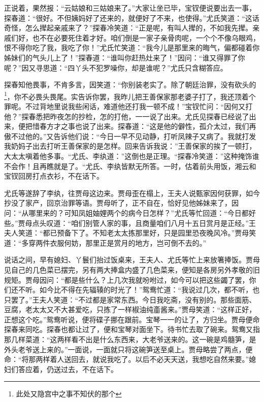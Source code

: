 \documentclass[12pt,oneside]{book}
\begin{document}
正说着，果然报：“云姑娘和三姑娘来了。”大家让坐已毕，宝钗便说要出去一事，探春道：“很好。不但姨妈好了还来的，就便好了不来，也使得。”尤氏笑道：“这话奇怪，怎么撵起亲戚来了？”探春冷笑道：“正是呢，有叫人撵的，不如我先撵。亲戚们好，也不在必要死住着才好。咱们倒是一家子亲骨肉呢，一个个不像乌眼鸡，恨不得你吃了我，我吃了你！”尤氏忙笑道：“我今儿是那里来的晦气，偏都碰着你姊妹们的气头儿上了！”探春道：“谁叫你赶热灶来了！”因问：“谁又得罪了你呢？”因又寻思道：“四丫头不犯罗噪你，却是谁呢？”尤氏只含糊答应。

探春知他畏事，不肯多言，因笑道：“你别装老实了。除了朝廷治罪，没有砍头的\footnote{此处又隐宫中之事不知伏的那个}，你不必畏头畏尾。实告诉你罢，我昨儿把王善保家那老婆子打了，我还顶着个罪呢。不过背地里说我些闲话，难道他还打我一顿不成！”宝钗忙问：“因何又打他？”探春悉把昨夜怎的抄检，怎的打他，一一说了出来。尤氏见探春已经说了出来，便把惜春方才之事也说了出来。探春道：“这是他的僻性，孤介太过，我们再傲不过他的。”又告诉他们说：“今日一早不见动静，打听凤辣子又病了。我就打发我奶妈子出去打听王善保家的是怎样。回来告诉我说：”王善保家的挨了一顿打，大太太嗔着他多事。“尤氏、李纨道：”这倒也是正理。“探春冷笑道：”这种掩饰谁不会作！且再瞧就是了。“尤氏、李纨皆默无所答。一时，估着前头用饭，湘云和宝钗回房打点衣衫，不在话下。

尤氏等遂辞了李纨，往贾母这边来。贾母歪在榻上，王夫人说甄家因何获罪，如今抄没了家产，回京治罪等语。贾母听了，正不自在，恰好见他姊妹来了，因问：“从哪里来的？可知凤姐妯娌两个的病今日怎样？”尤氏等忙回道：“今日都好些。”贾母点头叹道：“咱们别管人家的事，且商量咱们八月十五日赏月是正经。”王夫人笑道：“都已预备下了。不知老太太拣那里好，只是园里恐夜晚风冷。”贾母笑道：“多穿两件衣服何妨，那里正是赏月的地方，岂可倒不去的。”

说话之间，早有媳妇、丫鬟们抬过饭桌来，王夫人、尤氏等忙上来放箸捧饭。贾母见自己的几色菜已摆完，另有两大捧盒内盛了几色菜来，便知是各房另外孝敬的旧规矩。贾母因问：“都是些什么？上几次我就吩咐过，如今可以把这些蠲了罢，你们还不听。如今比不得在先辐辏的时光了！”鸳鸯忙道：“我说过几次，都不听，也只罢了。”王夫人笑道：“不过都是家常东西。今日我吃斋，没有别的。那些面筋、豆腐，老太太又不大甚爱吃，只拣了一样椒油纯齑酱来。”贾母笑道：“这样正好，正想这个吃。”鸳鸯听说，便将碟子挪在跟前。宝琴一一的让了，方归坐。贾母便命探春来同吃。探春也都让过了，便和宝琴对面坐下。待书忙去取了碗来。鸳鸯又指那几样菜道：“这两样看不出是什么东西来，大老爷送来的。这一碗是鸡髓笋，是外头老爷送上来的。”一面说，一面就只将这碗笋送至桌上。贾母略尝了两点，便命：“将那两样着人送回去，就说我吃了。以后不必天天送，我想吃自然来要。”媳妇们答应着，仍送过去，不在话下。
\end{document}
